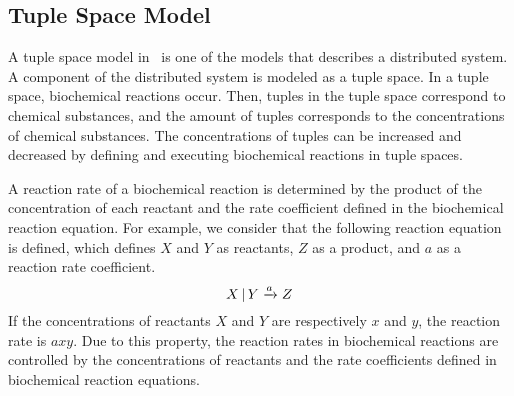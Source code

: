 \documentclass[technicalreport]{ieicej}
\begin{document}
	\subsection{Tuple Space Model}
	\label{subsec:tuple_space_model}
	A tuple space model in~\cite{kokisakata2018masterthesis} is one of the models that describes a distributed system.
	A component of the distributed system is modeled as a tuple space.
	In a tuple space, biochemical reactions occur.
	Then, tuples in the tuple space correspond to chemical substances, and the amount of tuples corresponds to the concentrations of chemical substances.
	The concentrations of tuples can be increased and decreased by defining and executing biochemical reactions in tuple spaces.

	A reaction rate of a biochemical reaction is determined by the product of the concentration of each reactant and the rate coefficient defined in the biochemical reaction equation.
	For example, we consider that the following reaction equation is defined, which defines $X$ and $Y$ as  reactants, $Z$ as a product, and $a$ as a reaction rate coefficient.
	\[
	X\,|\,Y \xrightarrow[]{a}Z\\
	\]
	If the concentrations of reactants $X$ and $Y$ are respectively $x$ and $y$, the reaction rate is $axy$.
	Due to this property, the reaction rates in biochemical reactions are controlled by the concentrations of reactants and the rate coefficients defined in biochemical reaction equations.
\end{document}
